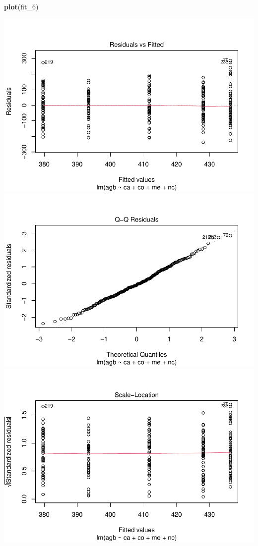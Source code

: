 \documentclass[
]{article}
\newenvironment{Shaded}{\begin{snugshade}}{\end{snugshade}}
\newcommand{\FunctionTok}[1]{\textcolor[rgb]{0.13,0.29,0.53}{\textbf{#1}}}
\newcommand{\NormalTok}[1]{#1}
\begin{document}
\begin{Shaded}
\begin{Highlighting}[]
\FunctionTok{plot}\NormalTok{(fit\_6)}
\end{Highlighting}
\end{Shaded}

\includegraphics{Stats-Lab-7_files/figure-latex/unnamed-chunk-16-1.pdf}
\includegraphics{Stats-Lab-7_files/figure-latex/unnamed-chunk-16-2.pdf}
\includegraphics{Stats-Lab-7_files/figure-latex/unnamed-chunk-16-3.pdf}
\end{document}
